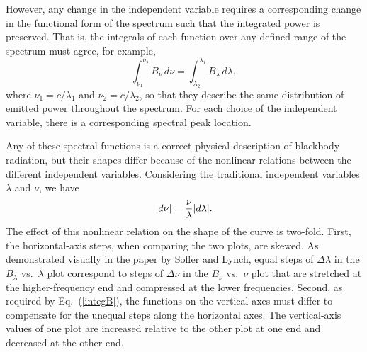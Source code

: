 \documentclass[12pt,aps,prb,preprint]{revtex4}   %
\begin{document}
However, any change in the independent variable requires a corresponding change in the functional form of the spectrum such that the integrated power is preserved. That is,
the integrals of each function over any defined range of the spectrum must agree, for example,
\begin{equation}
\label{integB}
\int_{\nu_1}^{\nu_2}{B_\nu \,d\nu}=\int_{\lambda_2}^{\lambda_1}{B_\lambda \,d\lambda}, 
\end{equation}
where $\nu_1 = c / \lambda_1$ and $\nu_2 = c / \lambda_2$, so that they describe the same distribution of emitted power throughout the spectrum.  For each choice of the independent variable, there is a corresponding spectral peak location.  

Any of these spectral functions is a correct physical description of blackbody radiation, but their shapes differ because of 
the nonlinear relations between the different independent variables.  Considering the traditional independent variables $\lambda$ and $\nu$, we have
\begin{equation}
\label{dnuvdlambda}
|d\nu| = {\nu \over \lambda} |d\lambda|.
\end{equation}
The effect of this nonlinear relation on the shape of the curve is two-fold.  First, the horizontal-axis steps, when comparing the two plots, are skewed.  As demonstrated visually in the paper by Soffer and Lynch,\cite{SL} equal steps of $\Delta\lambda$ in the 
$B_\lambda$ vs.\ $\lambda$ plot correspond to steps of $\Delta\nu$ in the $B_\nu$ vs.\ $\nu$ plot that are stretched at the higher-frequency end and compressed at the lower frequencies.  Second, as required by Eq.~(\ref{integB}), the functions on the vertical axes must differ to compensate for the unequal steps along the horizontal axes.  The vertical-axis values of one plot are increased relative to the other plot at one end and decreased at the other end.  
\end{document}

